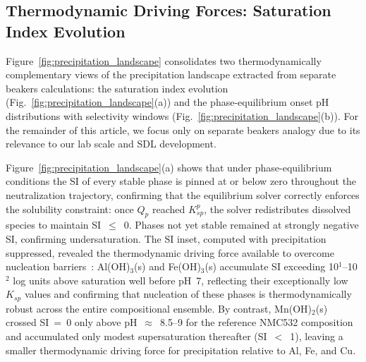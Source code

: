 \documentclass[final,2p,times]{elsarticle}
\begin{document}

\subsection{Thermodynamic Driving Forces: Saturation Index Evolution}

Figure~\ref{fig:precipitation_landscape} consolidates two thermodynamically complementary views of the precipitation landscape extracted from separate beakers calculations: the saturation index evolution (Fig.~\ref{fig:precipitation_landscape}(a)) and the phase-equilibrium onset pH distributions with selectivity windows (Fig.~\ref{fig:precipitation_landscape}(b)). For the remainder of this article, we focus only on separate beakers analogy due to its relevance to our lab scale and SDL development.

Figure~\ref{fig:precipitation_landscape}(a) shows that under phase-equilibrium conditions the SI of every stable phase is pinned at or below zero throughout the neutralization trajectory, confirming that the equilibrium solver correctly enforces the solubility constraint: once $Q_p$ reached $K_{sp}^p$, the solver redistributes dissolved species to maintain SI~$\leq$~0. Phases not yet stable remained at strongly negative SI, confirming undersaturation. The SI inset, computed with precipitation suppressed, revealed the thermodynamic driving force available to overcome nucleation barriers~\cite{stumm_aquatic_1996, bard_electrochemical_2022}: Al(OH)$_3$(s) and Fe(OH)$_3$(s) accumulate SI exceeding 10$^1$--10$^2$ log units above saturation well before pH~7, reflecting their exceptionally low $K_{sp}$ values and confirming that nucleation of these phases is thermodynamically robust across the entire compositional ensemble. By contrast, Mn(OH)$_2$(s) crossed SI~=~0 only above pH~$\approx$~8.5--9 for the reference NMC532 composition and accumulated only modest supersaturation thereafter (SI~$<$~1), leaving a smaller thermodynamic driving force for precipitation relative to Al, Fe, and Cu.
\end{document}
